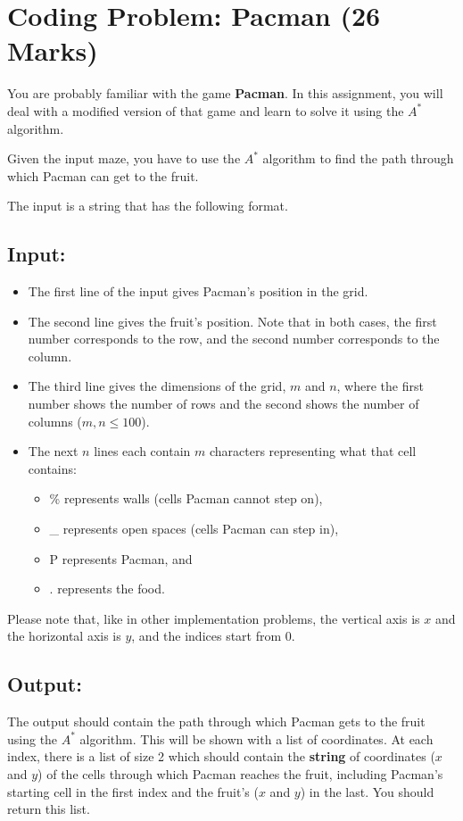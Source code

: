 \documentclass[12pt]{article}
\begin{document}
\section{Coding Problem: Pacman (26 Marks)}

You are probably familiar with the game \textbf{Pacman}. In this assignment, you will deal with a modified version of that game and learn to solve it using the $A^{*}$ algorithm.

Given the input maze, you have to use the $A^{*}$ algorithm to find the path through which Pacman can get to the fruit.

The input is a string that has the following format.

\subsection{Input:}
\begin{itemize}
    \item The first line of the input gives Pacman's position in the grid.
    \item The second line gives the fruit's position. Note that in both cases, the first number corresponds to the row, and the second number corresponds to the column.
    \item The third line gives the dimensions of the grid, $m$ and $n$, where the first number shows the number of rows and the second shows the number of columns ($m, n \leq 100$).
    \item The next $n$ lines each contain $m$ characters representing what that cell contains:
          \begin{itemize}
              \item \% represents walls (cells Pacman cannot step on),
              \item \_ represents open spaces (cells Pacman can step in),
              \item P represents Pacman, and
              \item . represents the food.
          \end{itemize}
\end{itemize}

Please note that, like in other implementation problems, the vertical axis is $x$ and the horizontal axis is $y$, and the indices start from 0.

\subsection{Output:}
The output should contain the path through which Pacman gets to the fruit using the $A^{*}$ algorithm. This will be shown with a list of coordinates. At each index, there is a list of size 2 which should contain the \textbf{string} of coordinates ($x$ and $y$) of the cells through which Pacman reaches the fruit, including Pacman's starting cell in the first index and the fruit's ($x$ and $y$) in the last. You should return this list.
\end{document}
